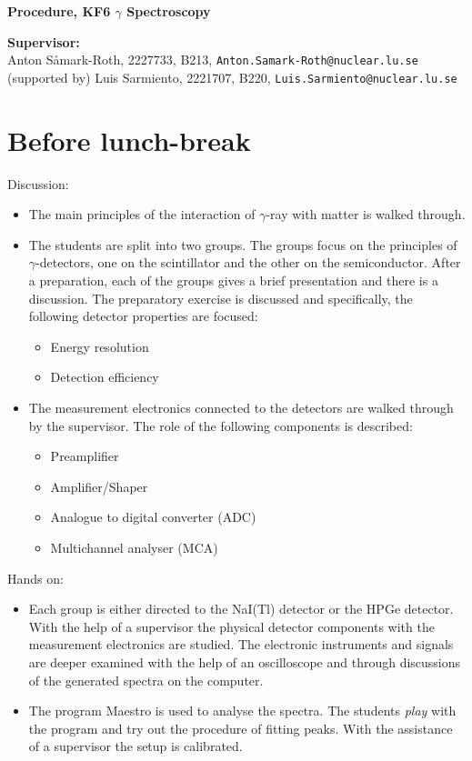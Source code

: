 \documentclass[12pt]{article}
\begin{document}
\begin{center} {\Large\bf\boldmath Procedure, KF6 $\gamma$ Spectroscopy}\\
\end{center}

{\bf Supervisor:}\\
Anton S\r{a}mark-Roth,     2227733, B213, \texttt{Anton.Samark-Roth@nuclear.lu.se}\\
(supported by) Luis Sarmiento, 2221707, B220, \texttt{Luis.Sarmiento@nuclear.lu.se}\\


\section*{Before lunch-break}
Discussion:
\begin{itemize}
  \item The main principles of the interaction of $\gamma$-ray with matter is walked through.
  \item The students are split into two groups. The groups focus on the principles of $\gamma$-detectors, one on the scintillator and the other on the semiconductor. After a preparation, each of the groups gives a brief presentation and there is a discussion. The preparatory exercise is discussed and specifically, the following detector properties are focused:
    \begin{itemize}
      \item Energy resolution
      \item Detection efficiency
    \end{itemize}
  \item The measurement electronics connected to the detectors are walked through by the supervisor. The role of the following components is described:
  \begin{itemize}
    \item Preamplifier
    \item Amplifier/Shaper
    \item Analogue to digital converter (ADC)
    \item Multichannel analyser (MCA)
  \end{itemize}
\end{itemize}

Hands on:
\begin{itemize}
  \item Each group is either directed to the NaI(Tl) detector or the HPGe detector. With the help of a supervisor the physical detector components with the measurement electronics are studied. The electronic instruments and signals are deeper examined with the help of an oscilloscope and through discussions of the generated spectra on the computer.
  \item The program Maestro is used to analyse the spectra. The students \textit{play} with the program and try out the procedure of fitting peaks. With the assistance of a supervisor the setup is calibrated.
\end{itemize}
\end{document}
